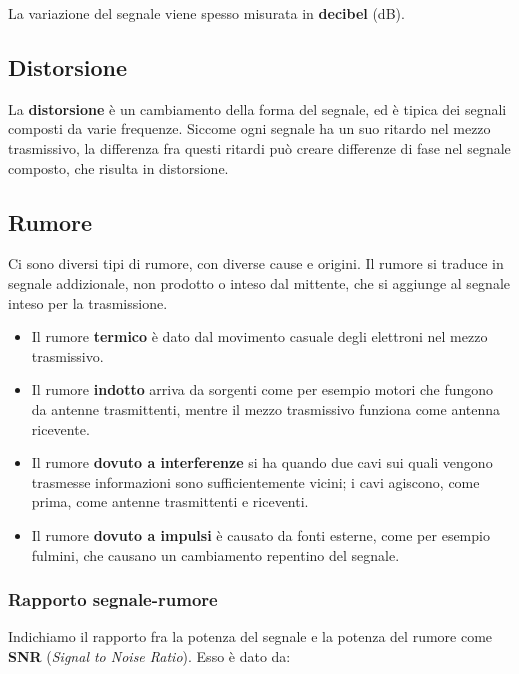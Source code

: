         La variazione del segnale viene spesso misurata in \textbf{decibel} (dB).
        
    \subsection{Distorsione}
        La \textbf{distorsione} è un cambiamento della forma del segnale, ed è tipica dei segnali composti da varie frequenze. Siccome ogni segnale ha un suo ritardo nel mezzo trasmissivo, la differenza fra questi ritardi può creare differenze di fase nel segnale composto, che risulta in distorsione.
        
    \subsection{Rumore}
        Ci sono diversi tipi di rumore, con diverse cause e origini. Il rumore si traduce in segnale addizionale, non prodotto o inteso dal mittente, che si aggiunge al segnale inteso per la trasmissione.
        
        \begin{itemize}
            \item Il rumore \textbf{termico} è dato dal movimento casuale degli elettroni nel mezzo trasmissivo.
            
            \item Il rumore \textbf{indotto} arriva da sorgenti come per esempio motori che fungono da antenne trasmittenti, mentre il mezzo trasmissivo funziona come antenna ricevente.
            
            \item Il rumore \textbf{dovuto a interferenze} si ha quando due cavi sui quali vengono trasmesse informazioni sono sufficientemente vicini; i cavi agiscono, come prima, come antenne trasmittenti e riceventi.
            
            \item Il rumore \textbf{dovuto a impulsi} è causato da fonti esterne, come per esempio fulmini, che causano un cambiamento repentino del segnale.
        \end{itemize}
        
        \subsubsection{Rapporto segnale-rumore}
            Indichiamo il rapporto fra la potenza del segnale e la potenza del rumore come \textbf{SNR} (\textit{Signal to Noise Ratio}). Esso è dato da:
            
